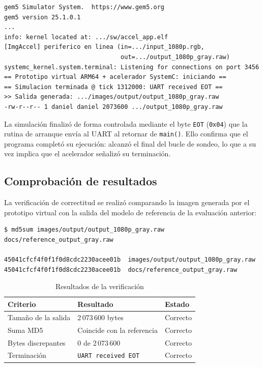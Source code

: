 \documentclass[11pt,letterpaper]{article}
\begin{document}
\begin{lstlisting}[style=consola,caption={Salida de \texttt{./scripts/run\_vp.sh}.}]
gem5 Simulator System.  https://www.gem5.org
gem5 version 25.1.0.1
...
info: kernel located at: .../sw/accel_app.elf
[ImgAccel] periferico en linea (in=.../input_1080p.rgb,
                                out=.../output_1080p_gray.raw)
systemc_kernel.system.terminal: Listening for connections on port 3456
== Prototipo virtual ARM64 + acelerador SystemC: iniciando ==
== Simulacion terminada @ tick 1312000: UART received EOT ==
>> Salida generada: .../images/output/output_1080p_gray.raw
-rw-r--r-- 1 daniel daniel 2073600 .../output_1080p_gray.raw
\end{lstlisting}

La simulación finalizó de forma controlada mediante el byte \texttt{EOT}
(\texttt{0x04}) que la rutina de arranque envía al UART al retornar de
\texttt{main()}. Ello confirma que el programa completó su ejecución: alcanzó el
final del bucle de sondeo, lo que a su vez implica que el acelerador señalizó su
terminación.

\subsection{Comprobación de resultados}
\label{sec:comprobacion}

La verificación de correctitud se realizó comparando la imagen generada por el
prototipo virtual con la salida del modelo de referencia de la evaluación
anterior:

\begin{lstlisting}[style=consola,caption={Verificacion mediante suma de comprobacion.}]
$ md5sum images/output/output_1080p_gray.raw docs/reference_output_gray.raw

45041cfcf4f0f1f0d8cdc2230acee01b  images/output/output_1080p_gray.raw
45041cfcf4f0f1f0d8cdc2230acee01b  docs/reference_output_gray.raw
\end{lstlisting}

\begin{table}[H]
\centering
\caption{Resultados de la verificación}
\begin{tabular}{@{}lll@{}}
\toprule
\textbf{Criterio} & \textbf{Resultado} & \textbf{Estado} \\
\midrule
Tamaño de la salida   & 2\,073\,600 bytes & \textcolor{verdeok}{Correcto} \\
Suma MD5              & Coincide con la referencia &
  \textcolor{verdeok}{Correcto} \\
Bytes discrepantes    & 0 de 2\,073\,600 & \textcolor{verdeok}{Correcto} \\
Terminación           & \texttt{UART received EOT} &
  \textcolor{verdeok}{Correcto} \\
\bottomrule
\end{tabular}
\end{table}
\end{document}
